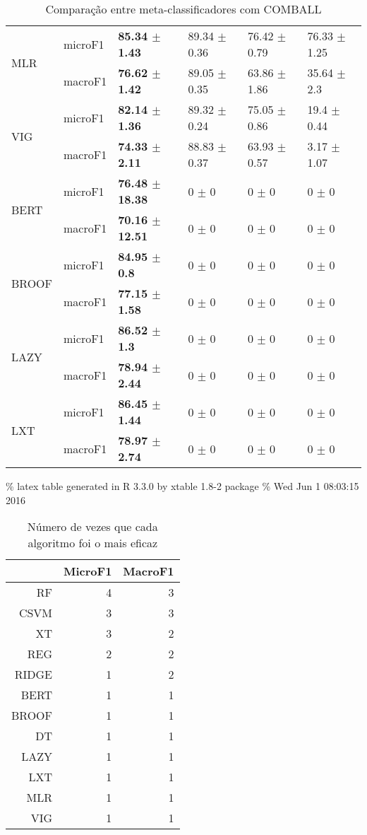 \documentclass[]{article}
\begin{document}
\begin{table}[ht]
\begin{tabular}{llllll}
   \cline{3-6}\multirow{2}{*}{MLR} & microF1 & \bf{85.34 $\pm$  1.43} & 89.34 $\pm$  0.36 & 76.42 $\pm$  0.79 & 76.33 $\pm$  1.25 \\ 
   & macroF1 & \bf{76.62 $\pm$  1.42} & 89.05 $\pm$  0.35 & 63.86 $\pm$  1.86 & 35.64 $\pm$  2.3 \\ 
   \cline{3-6}\multirow{2}{*}{VIG} & microF1 & \bf{82.14 $\pm$  1.36} & 89.32 $\pm$  0.24 & 75.05 $\pm$  0.86 & 19.4 $\pm$  0.44 \\ 
   & macroF1 & \bf{74.33 $\pm$  2.11} & 88.83 $\pm$  0.37 & 63.93 $\pm$  0.57 & 3.17 $\pm$  1.07 \\ 
   \cline{3-6}\multirow{2}{*}{BERT} & microF1 & \bf{76.48 $\pm$  18.38} & 0 $\pm$  0 & 0 $\pm$  0 & 0 $\pm$  0 \\ 
   & macroF1 & \bf{70.16 $\pm$  12.51} & 0 $\pm$  0 & 0 $\pm$  0 & 0 $\pm$  0 \\ 
   \cline{3-6}\multirow{2}{*}{BROOF} & microF1 & \bf{84.95 $\pm$  0.8} & 0 $\pm$  0 & 0 $\pm$  0 & 0 $\pm$  0 \\ 
   & macroF1 & \bf{77.15 $\pm$  1.58} & 0 $\pm$  0 & 0 $\pm$  0 & 0 $\pm$  0 \\ 
   \cline{3-6}\multirow{2}{*}{LAZY} & microF1 & \bf{86.52 $\pm$  1.3} & 0 $\pm$  0 & 0 $\pm$  0 & 0 $\pm$  0 \\ 
   & macroF1 & \bf{78.94 $\pm$  2.44} & 0 $\pm$  0 & 0 $\pm$  0 & 0 $\pm$  0 \\ 
   \cline{3-6}\multirow{2}{*}{LXT} & microF1 & \bf{86.45 $\pm$  1.44} & 0 $\pm$  0 & 0 $\pm$  0 & 0 $\pm$  0 \\ 
   & macroF1 & \bf{78.97 $\pm$  2.74} & 0 $\pm$  0 & 0 $\pm$  0 & 0 $\pm$  0 \\ 
   \cline{3-6}\end{tabular}
\caption{Comparação entre meta-classificadores com COMBALL} 
\label{tab:meta-class
}
\end{table}

\% latex table generated in R 3.3.0 by xtable 1.8-2 package \% Wed Jun 1
08:03:15 2016

\begin{table}[ht]
\centering
\begin{tabular}{rrr}
  \hline
 & MicroF1 & MacroF1 \\ 
  \hline
RF &   4 &   3 \\ 
  CSVM &   3 &   3 \\ 
  XT &   3 &   2 \\ 
  REG &   2 &   2 \\ 
  RIDGE &   1 &   2 \\ 
  BERT &   1 &   1 \\ 
  BROOF &   1 &   1 \\ 
  DT &   1 &   1 \\ 
  LAZY &   1 &   1 \\ 
  LXT &   1 &   1 \\ 
  MLR &   1 &   1 \\ 
  VIG &   1 &   1 \\ 
   \hline
\end{tabular}
\caption{Número de vezes que cada algoritmo foi o mais eficaz} 
\label{tab:win_count_meta-class}
\end{table}

\renewcommand\refname{References}

\end{document}
